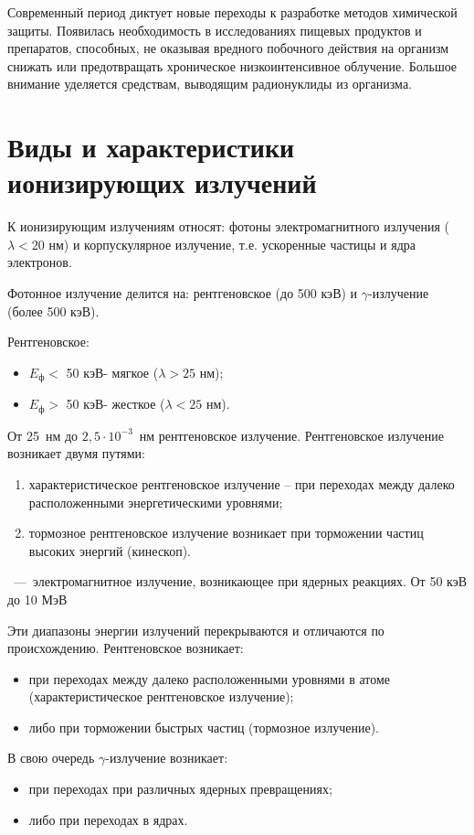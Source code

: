 \documentclass[a4paper, 14pt]{article}
\renewcommand{\emph}[1]{{\color{RedOrange}{\textit{\textbf{#1}}}}}
\begin{document}
Современный период диктует новые переходы к разработке методов химической защиты. Появилась необходимость в исследованиях пищевых продуктов и препаратов, способных, не оказывая вредного побочного действия на организм снижать или предотвращать хроническое низкоинтенсивное облучение. Большое внимание уделяется средствам, выводящим радионуклиды из организма.

\section{Виды и характеристики ионизирующих излучений}
К ионизирующим излучениям относят: фотоны электромагнитного излучения ($\lambda < 20$ нм) и корпускулярное излучение, т.е. ускоренные частицы и ядра электронов.

Фотонное излучение делится на: рентгеновское (до 500 кэВ) и $\gamma$-{\nolinebreak}излучение
(более 500 кэВ).

Рентгеновское:
\begin{itemize}
    \item $E_\text{ф}<$ 50 кэВ- мягкое ($\lambda > 25$ нм);
    \item $E_\text{ф}>$ 50 кэВ- жесткое ($\lambda < 25$ нм).
\end{itemize}
От 25~нм до $2,5\cdot 10^{-3}$~нм рентгеновское излучение.
Рентгеновское излучение возникает двумя путями:
\begin{enumerate}
    \item характеристическое рентгеновское излучение – при переходах между
    далеко расположенными энергетическими уровнями;
    \item тормозное рентгеновское излучение возникает при торможении частиц
    высоких энергий (кинескоп).
\end{enumerate}
\emph{$\gamma$-излучение}~---~электромагнитное излучение, возникающее при ядерных реакциях. От
50 кэВ до 10 МэВ

Эти диапазоны энергии излучений перекрываются и отличаются по происхождению. Рентгеновское возникает: 
\begin{itemize}
    \item при переходах между далеко расположенными уровнями в атоме (характеристическое рентгеновское излучение);
    \item либо при торможении быстрых частиц (тормозное излучение). 
\end{itemize}

В свою очередь $\gamma$-излучение возникает: 
\begin{itemize}
    \item при переходах при различных ядерных превращениях;
    \item либо при переходах в ядрах.
\end{itemize} 
\end{document}
